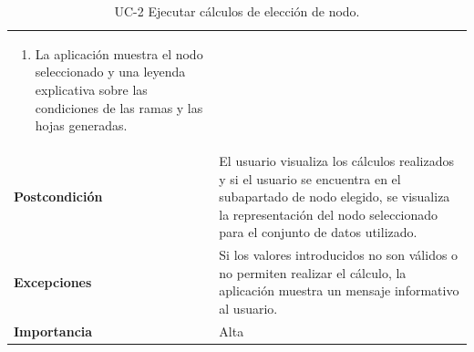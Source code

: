 \begin{table}[p]
\begin{tabularx}{\linewidth}{p{} p{}}
\begin{enumerate}
            \item La aplicación muestra el nodo seleccionado y una leyenda explicativa sobre las condiciones de las ramas y las hojas generadas.
        \end{enumerate} \\
        \textbf{Postcondición} & El usuario visualiza los cálculos realizados y si el usuario se encuentra en el subapartado de nodo elegido, se visualiza la representación del nodo seleccionado para el conjunto de datos utilizado. \\
        \textbf{Excepciones} & Si los valores introducidos no son válidos o no permiten realizar el cálculo, la aplicación muestra un mensaje informativo al usuario. \\
        \textbf{Importancia} & Alta \\
        \bottomrule
    \end{tabularx}
    \caption{UC-2 Ejecutar cálculos de elección de nodo.}
    \label{tabla:uc_2}
\end{table}


